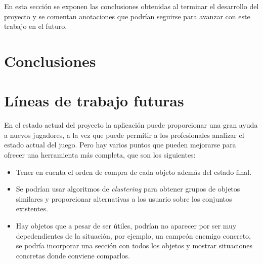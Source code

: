 
En esta sección se exponen las conclusiones obtenidas al terminar el desarrollo del proyecto y se comentan anotaciones que podrían seguirse para avanzar con este trabajo en el futuro.

\section{Conclusiones}


\section{Líneas de trabajo futuras}
En el estado actual del proyecto la aplicación puede proporcionar una gran ayuda a nuevos jugadores, a la vez que puede permitir a los profesionales analizar el estado actual del juego. Pero hay varios puntos que pueden mejorarse para ofrecer una herramienta más completa, que son los siguientes:
\begin{itemize}
	\item Tener en cuenta el orden de compra de cada objeto además del estado final.
	\item Se podrían usar algoritmos de \textit{clustering} para obtener grupos de objetos similares y proporcionar alternativas a los usuario sobre los conjuntos existentes.
	\item Hay objetos que a pesar de ser útiles, podrían no aparecer por ser muy depedendientes de la situación, por ejemplo, un campeón enemigo concreto, se podría incorporar una sección con todos los objetos y mostrar situaciones concretas donde conviene comparlos.
\end{itemize}